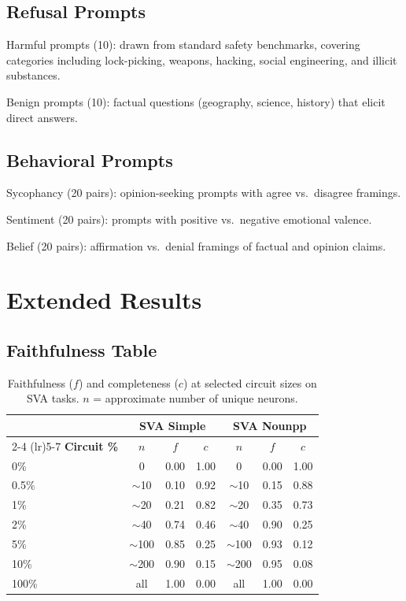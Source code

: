 \documentclass[11pt]{article}
\begin{document}
\subsection{Refusal Prompts}

Harmful prompts (10): drawn from standard safety benchmarks, covering categories including lock-picking, weapons, hacking, social engineering, and illicit substances.

Benign prompts (10): factual questions (geography, science, history) that elicit direct answers.

\subsection{Behavioral Prompts}

Sycophancy (20 pairs): opinion-seeking prompts with agree vs.\ disagree framings.

Sentiment (20 pairs): prompts with positive vs.\ negative emotional valence.

Belief (20 pairs): affirmation vs.\ denial framings of factual and opinion claims.


\section{Extended Results}
\label{sec:extended_results}

\subsection{Faithfulness Table}

\begin{table}[htbp]
\centering
\caption{Faithfulness ($f$) and completeness ($c$) at selected circuit sizes on SVA tasks. $n$ = approximate number of unique neurons.}
\label{tab:faithfulness_full}
\small
\begin{tabular}{lcccccc}
\toprule
& \multicolumn{3}{c}{\textbf{SVA Simple}} & \multicolumn{3}{c}{\textbf{SVA Nounpp}} \\
\cmidrule(lr){2-4} \cmidrule(lr){5-7}
\textbf{Circuit \%} & $n$ & $f$ & $c$ & $n$ & $f$ & $c$ \\
\midrule
0\%    & 0         & 0.00 & 1.00 & 0         & 0.00 & 1.00 \\
0.5\%  & $\sim$10  & 0.10 & 0.92 & $\sim$10  & 0.15 & 0.88 \\
1\%    & $\sim$20  & 0.21 & 0.82 & $\sim$20  & 0.35 & 0.73 \\
2\%    & $\sim$40  & 0.74 & 0.46 & $\sim$40  & 0.90 & 0.25 \\
5\%    & $\sim$100 & 0.85 & 0.25 & $\sim$100 & 0.93 & 0.12 \\
10\%   & $\sim$200 & 0.90 & 0.15 & $\sim$200 & 0.95 & 0.08 \\
100\%  & all       & 1.00 & 0.00 & all       & 1.00 & 0.00 \\
\bottomrule
\end{tabular}
\end{table}
\end{document}
